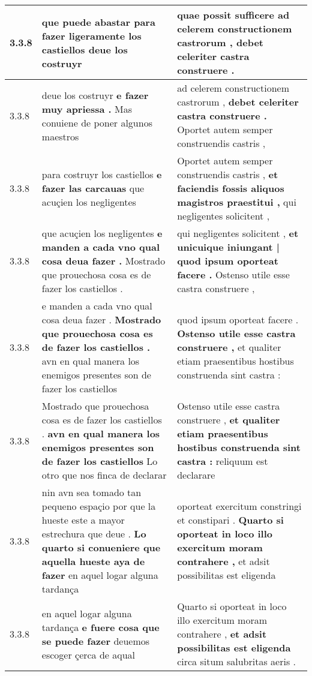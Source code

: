 \begin{tabular}{|p{1cm}|p{6.5cm}|p{6.5cm}|}
3.3.8 & que puede abastar \textbf{ para fazer ligeramente los castiellos } deue los costruyr & quae possit sufficere \textbf{ ad celerem constructionem castrorum , } debet celeriter castra construere . \\\hline
3.3.8 & deue los costruyr \textbf{ e fazer muy apriessa . } Mas conuiene de poner algunos maestros & ad celerem constructionem castrorum , \textbf{ debet celeriter castra construere . } Oportet autem semper construendis castris , \\\hline
3.3.8 & para costruyr los castiellos \textbf{ e fazer las carcauas } que acuçien los negligentes & Oportet autem semper construendis castris , \textbf{ et faciendis fossis aliquos magistros praestitui , } qui negligentes solicitent , \\\hline
3.3.8 & que acuçien los negligentes \textbf{ e manden a cada vno qual cosa deua fazer . } Mostrado que prouechosa cosa es de fazer los castiellos . & qui negligentes solicitent , \textbf{ et unicuique iniungant | quod ipsum oporteat facere . } Ostenso utile esse castra construere , \\\hline
3.3.8 & e manden a cada vno qual cosa deua fazer . \textbf{ Mostrado que prouechosa cosa es de fazer los castiellos . } avn en qual manera los enemigos presentes son de fazer los castiellos & quod ipsum oporteat facere . \textbf{ Ostenso utile esse castra construere , } et qualiter etiam praesentibus hostibus construenda sint castra : \\\hline
3.3.8 & Mostrado que prouechosa cosa es de fazer los castiellos . \textbf{ avn en qual manera los enemigos presentes son de fazer los castiellos } Lo otro que nos finca de declarar & Ostenso utile esse castra construere , \textbf{ et qualiter etiam praesentibus hostibus construenda sint castra : } reliquum est declarare \\\hline
3.3.8 & nin avn sea tomado tan pequeno espaçio por que la hueste este a mayor estrechura que deue . \textbf{ Lo quarto si conueniere que aquella hueste aya de fazer } en aquel logar alguna tardança & oporteat exercitum constringi et constipari . \textbf{ Quarto si oporteat in loco illo exercitum moram contrahere , } et adsit possibilitas est eligenda \\\hline
3.3.8 & en aquel logar alguna tardança \textbf{ e fuere cosa que se puede fazer } deuemos escoger çerca de aqual & Quarto si oporteat in loco illo exercitum moram contrahere , \textbf{ et adsit possibilitas est eligenda } circa situm salubritas aeris . \\\hline

\end{tabular}
